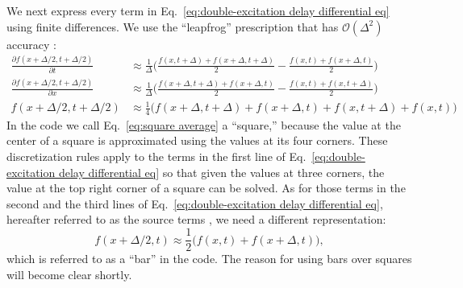 \documentclass[12pt,letter,onecolumn,notitlepage]{article}
\begin{document}
We next express every term in Eq.~\eqref{eq:double-excitation delay differential eq} using finite differences. We use the ``leapfrog'' prescription that has $\mathcal{O}(\Delta^2)$ accuracy \cite{NumericalRecipes}:
\begin{align}
	\frac{\partial f(x+\Delta/2,t+\Delta/2)}{\partial t} & \approx\frac{1}{\Delta} \biggl(\frac{f(x,t+\Delta)+f(x+\Delta,t+\Delta)}{2}
		-\frac{f(x,t)+f(x+\Delta,t)}{2}\biggr)\\
	\frac{\partial f(x+\Delta/2,t+\Delta/2)}{\partial x} &\approx \frac{1}{\Delta} \biggl(\frac{f(x+\Delta,t+\Delta)+f(x+\Delta,t)}{2}
		-\frac{f(x,t)+f(x,t+\Delta)}{2} \biggr)\\
	f(x+\Delta/2,t+\Delta/2)&\approx \frac{1}{4}\biggl(f(x+\Delta,t+\Delta)+f(x+\Delta,t)
		+f(x,t+\Delta)+f(x,t)\biggr) \label{eq:square average}
\end{align}
In the code we call Eq.~\eqref{eq:square average} a ``square,'' because the value at the center of a square is approximated using the values at its four corners. These discretization rules apply to the terms in the first line of Eq.~\eqref{eq:double-excitation delay differential eq} so that given the values at three corners, the value at the top right corner of a square can be solved. As for those terms in the second and the third lines of Eq.~\eqref{eq:double-excitation delay differential eq}, hereafter referred to as the source terms \cite{FangNM17}, we need a different representation:
\begin{equation}
f(x+\Delta/2,t)\approx \frac{1}{2}\biggl( f(x,t) + f(x+\Delta,t)\biggr), \label{eq:bar average}
\end{equation}
which is referred to as a ``bar'' in the code. The reason for using bars over squares will become clear shortly.

\end{document}
